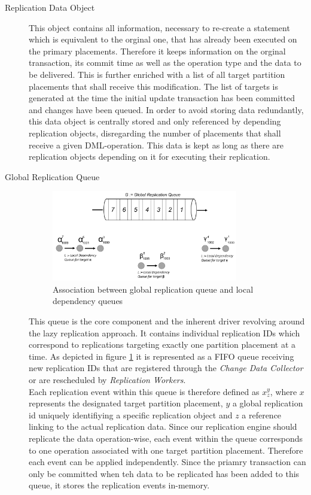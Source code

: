 \begin{description}

    \item[Replication Data Object] This object contains all information, necessary to re-create a statement which is equivalent to the orginal one,
    that has already been executed on the primary placements. 
    Therefore it keeps information on the orginal transaction, its commit time as well as the operation type and the data to be delivered. 
    This is further enriched with a list of all target partition placements that shall receive this modification. The list of targets is generated
    at the time the initial update transaction has been committed and changes have been queued. In order to avoid storing data redundantly, this data object 
    is centrally stored and only referenced by depending replication objects, disregarding the number of placements that shall receive a given DML-operation.
    This data is kept as long as there are replication objects depending on it for executing their replication.


    \item[Global Replication Queue] 
    
    \begin{figure}[t]
        \centering
        \includegraphics[width=0.8\textwidth]{Figures/Queue.png}
        \caption{Association between global replication queue and local dependency queues}
        \label{fig:queue}
    \end{figure}

    This queue is the core component and the inherent driver revolving around the lazy replication approach. 
    It contains individual replication IDs which correspond to replications targeting exactly one partition placement at a time.
    As depicted in figure \ref{fig:queue} it is represented as a FIFO queue receiving new replication IDs that are registered through the \emph{Change Data Collector} 
    or are rescheduled by \emph{Replication Workers}.\\
    Each replication event within this queue is therefore defined as $x_{z}^y$, where $x$ represents the designated target partition placement, $y$ a global
    replication id uniquely identifiying a specific replication object and $z$ a reference linking to the actual replication data. 
    Since our replication engine should replicate the data operation-wise, each event within the queue corresponds to one operation associated with one target partition placement.
    Therefore each event can be applied independently. Since the priamry transaction can only be committed when teh data to be replicated has been added to this queue,
    it stores the replication events in-memory.


\end{description}
